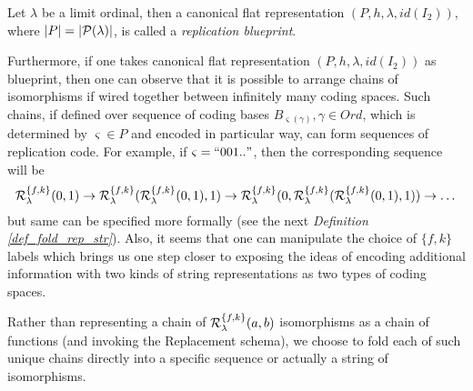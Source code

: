 \begin{definition}\label{def_rep_blueprint}
    Let $\lambda$ be a limit ordinal, then a canonical flat representation $(P, h, \lambda, id(I_2))$, where $|P| = |\mathcal{P}(\lambda)|$,  is called a \textit{replication blueprint}.
\end{definition}

Furthermore, if one takes canonical flat representation $(P, h, \lambda, id(I_2))$ as blueprint, then one can observe that it is possible to arrange chains of isomorphisms if wired together between infinitely many coding spaces. Such chains, if defined over sequence of coding bases $B_{\varsigma(\gamma)}, \gamma \in Ord$, which is determined by $\varsigma \in P$ and encoded in particular way, can form sequences of replication code. 
For example, if $\varsigma = \text{``} 001.. \text{''}$, then the corresponding sequence will be 
    \[ 
    \mathcal{R}^{\{f,k\}}_\lambda(0, 1) \to \mathcal{R}^{\{f,k\}}_\lambda(\mathcal{R}^{\{f,k\}}_\lambda(0, 1), 1) \to \mathcal{R}^{\{f,k\}}_\lambda(0, \mathcal{R}^{\{f,k\}}_\lambda(\mathcal{R}^{\{f,k\}}_\lambda(0, 1), 1)) \to \dots
    \] 
but same can be specified more formally (see the next \textit{Definition \ref{def_fold_rep_str}}). Also, it seems that one can manipulate the choice of $\{f,k\}$ labels which brings us one step closer to exposing the ideas of encoding additional information with two kinds of string representations as two types of coding spaces.

Rather than representing a chain of $\mathcal{R}^{\{f,k\}}_\lambda(a,b)$ isomorphisms as a chain of functions (and invoking the Replacement schema), we choose to fold each of such unique chains directly into a specific sequence or actually a string of isomorphisms. 

